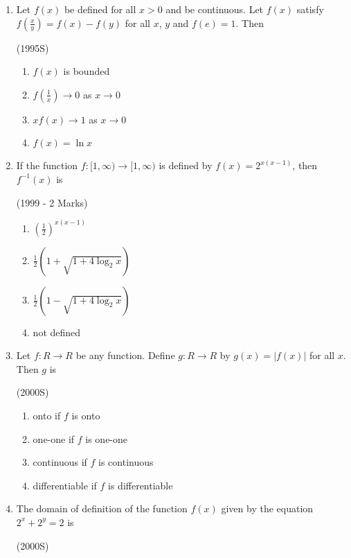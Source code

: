 \documentclass[journal,12pt,twocolumn]{IEEEtran}
\theoremstyle{remark}
\begin{document}
\begin{enumerate}
\item Let $f(x)$ be defined for all $x>0$ and be continuous. Let $f(x)$ satisfy $f\left(\frac{x}{y}\right)=f(x)-f(y)$ for all $x$, $y$ and $f(e)=1$. Then

\hfill{(1995S)}

\begin{multicols}{2}
	\begin{enumerate}
		\item $f(x)$ is bounded 
		\item $f\left(\frac{1}{x}\right)\to0$ as $x\to0$
		\item $xf(x)\to1$ as $x\to0$ 
		\item $f(x)=\ln{x}$
	\end{enumerate}
\end{multicols}

\item If the function $f:[1,\infty)\to[1,\infty)$ is defined by $f(x)=2^{x(x-1)}$, then $f^{-1}(x)$ is

\hfill{(1999 - 2 Marks)}

\begin{multicols}{2}
	\begin{enumerate}
		\item $\left(\frac{1}{2}\right)^{x(x-1)}$ 
		\item $\frac{1}{2}\left(1+\sqrt{1+4\log_{2}{x}}\right)$
		\item $\frac{1}{2}\left(1-\sqrt{1+4\log_{2}{x}}\right)$ 
		\item not defined
	\end{enumerate}
\end{multicols}

\item Let $f:R\to R$ be any function. Define $g:R\to R$ by $g(x)=|f(x)|$ for all $x$. Then $g$ is

\hfill{(2000S)}

\begin{enumerate}
\item onto if $f$ is onto
\item one-one if $f$ is one-one
\item continuous if $f$ is continuous
\item differentiable if $f$ is differentiable
\end{enumerate}

\item The domain of definition of the function $f(x)$ given by the equation $2^{x}+2^{y}=2$ is

\hfill{(2000S)}


\end{enumerate}
\end{document}
